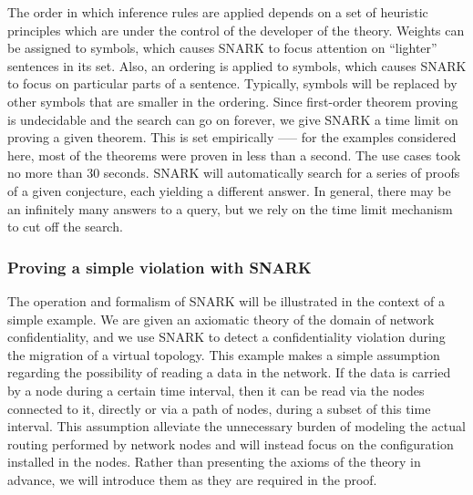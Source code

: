 The order in which inference rules are applied depends on a set of heuristic principles which are under the control of the developer of the theory. 
Weights can be assigned to symbols, which causes SNARK to focus attention on “lighter” sentences in its set. 
Also, an ordering is applied to symbols, which causes SNARK to focus on particular parts of a sentence. 
Typically, symbols will be replaced by other symbols that are smaller in the ordering. 
Since first-order theorem proving is undecidable and the search can go on forever, we give SNARK a time limit on proving a given theorem. 
This is set empirically \-—-- for the examples considered here, most of the theorems were proven in less than a second. The use cases took no more than 30 seconds.
SNARK will automatically search for a series of proofs of a given conjecture, each yielding a different answer.
In general, there may be an infinitely many answers to a query, but we rely on the time limit mechanism to cut off the search.


\subsubsection{Proving a simple violation with SNARK}
\label{sec:find-violation}
The operation and formalism of SNARK will be illustrated in the context of a simple example.
We are given an axiomatic theory of the domain of network confidentiality, and we use SNARK to detect a confidentiality violation during the migration of a virtual topology.
This example makes a simple assumption regarding the possibility of reading a data in the network. If the data is carried by a node during a certain time interval, then it can be read via the nodes connected to it, directly or via a path of nodes, during a subset of this time interval.
This assumption alleviate the unnecessary burden of modeling the actual routing performed by network nodes and will instead focus on the configuration installed in the nodes.
Rather than presenting the axioms of the theory in advance, we will introduce them as they are required in the proof.

